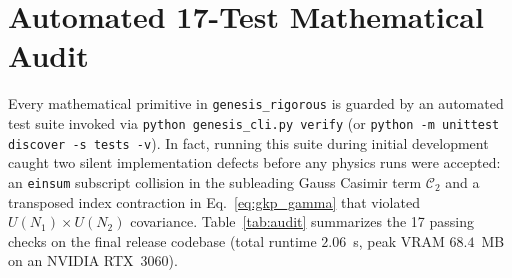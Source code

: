 \documentclass[11pt,a4paper]{article}
\begin{document}
\section{Automated 17-Test Mathematical Audit}
\label{sec:audit}

Every mathematical primitive in \texttt{genesis\_rigorous} is guarded by an automated test suite invoked via \texttt{python genesis\_cli.py verify} (or \texttt{python -m unittest discover -s tests -v}). In fact, running this suite during initial development caught two silent implementation defects before any physics runs were accepted: an \texttt{einsum} subscript collision in the subleading Gauss Casimir term $\mathcal{C}_2$ and a transposed index contraction in Eq.~\eqref{eq:gkp_gamma} that violated $U(N_1)\times U(N_2)$ covariance. Table~\ref{tab:audit} summarizes the 17 passing checks on the final release codebase (total runtime $2.06$~s, peak VRAM $68.4$~MB on an NVIDIA RTX~3060).
\end{document}
